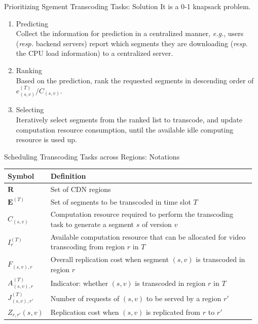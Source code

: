 \documentclass{beamer}
\newcommand{\comp}{C}
\newcommand{\TranscodeSet}{\mathbf{E}}
\newcommand{\IdleComp}{I}
\newcommand{\SegRepCost}{F}
\newcommand{\Assign}{A}
\newcommand{\ReqFromRegion}{J}
\newcommand{\CDNRegions}{\mathbf{R}}
\newcommand{\RegionRepCost}{Z}
\begin{document}
\begin{frame}{Prioritizing Sgement Transcoding Tasks: Solution}
	It is a 0-1 knapsack problem.
	\begin{enumerate}
		\item<1> Predicting\\
		Collect the information for prediction in a centralized manner, \emph{e.g.}, users (\emph{resp.} backend servers) report which segments they are downloading (\emph{resp.} the CPU load information) to a centralized server.
		\item<1> Ranking\\
		Based on the prediction, rank the requested segments in descending order of $e_{(s,v)}^{(T)}/\comp_{(s,v)}$.
		\item<1> Selecting\\
		Iteratively select segments from the ranked list to transcode, and update computation resource consumption, until the available idle computing resource is used up.
	\end{enumerate}
\end{frame}

\begin{frame}{Scheduling Transcoding Tasks across Regions: Notations}
	\centering
	\begin{tabular}{|p{0.13\linewidth}||p{0.84\linewidth}|}
		\hline 
		Symbol & Definition \\ 
		\hline
		\emph{$\CDNRegions$} 		& Set of CDN regions  \\
		\emph{$\TranscodeSet^{(T)}$} 		& Set of segments to be transcoded in time slot $T$  \\
		\emph{$\comp_{(s,v)}$} 		& Computation resource required to perform the transcoding task to generate a segment $s$ of version $v$ \\
		\emph{$\IdleComp^{(T)}_r$} 		& Available computation resource that can be allocated for video transcoding from region $r$ in $T$ \\
		\emph{$\SegRepCost_{(s,v),r}$} 		& Overall replication cost when segment $(s,v)$ is transcoded in region $r$ \\
		\emph{$\Assign^{(T)}_{(s,v),r}$} 		& Indicator: whether $(s,v)$ is transcoded in region $r$ in $T$ \\
		\emph{$\ReqFromRegion^{(T)}_{(s,v),r'}$} & Number of requests of $(s,v)$ to be served by a region $r'$ \\
		\emph{$\RegionRepCost_{r,r'}(s,v)$} & Replication cost when $(s,v)$ is replicated from $r$ to $r'$\\
		\hline 
	\end{tabular} 
\end{frame}
\end{document}
